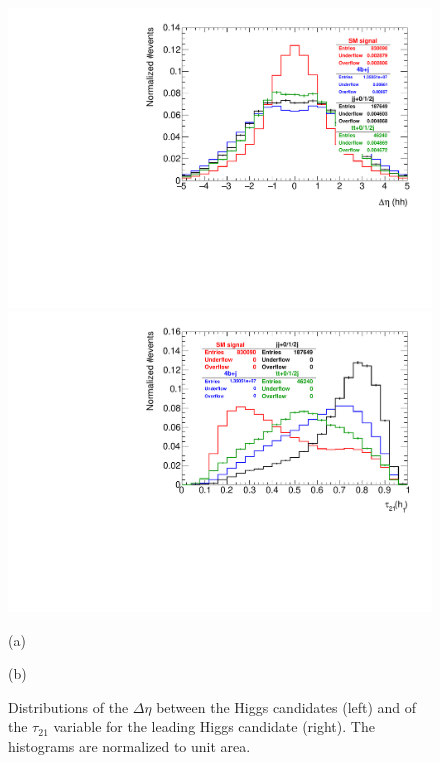 \begin{figure}
	\centering
	\begin{minipage}{.5\textwidth}
		\centering
		\includegraphics[trim={.65cm 0 0 0},clip,width=\linewidth]{./Figures/hist_hh_deltaEta.pdf}
	\end{minipage}%
	\begin{minipage}{.5\textwidth}
		\centering
		\includegraphics[trim={0 0 .65cm 0},clip,width=\linewidth]{./Figures/hist_h1_tau21.pdf}
	\end{minipage}
	\begin{minipage}[t]{0.5\textwidth}
		\caption*{(a)}
	\end{minipage}%
	\hfill
	\begin{minipage}[t]{0.5\textwidth}
		\caption*{(b)}
	\end{minipage}
	\caption{Distributions of the $\Delta\eta$ between the Higgs candidates (left) and of the $\tau_{21}$ variable for the leading Higgs candidate (right).  The histograms are normalized to unit area.}
	\label{fig:hh_deltaEta_h1_tau21}
\end{figure}
	

